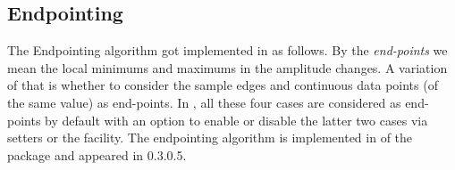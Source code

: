 







\subsection{Endpointing}

The Endpointing algorithm got implemented in {\marf} as follows.
By the {\em end-points} we mean the local minimums and maximums
in the amplitude changes. A variation of that is whether to
consider the sample edges and continuous data points (of the same
value) as end-points. In {\marf}, all these four cases
are considered as end-points by default with an option to
enable or disable the latter two cases via setters or the 
facility. The endpointing algorithm is implemented in 
of the  package and appeared in 0.3.0.5.













